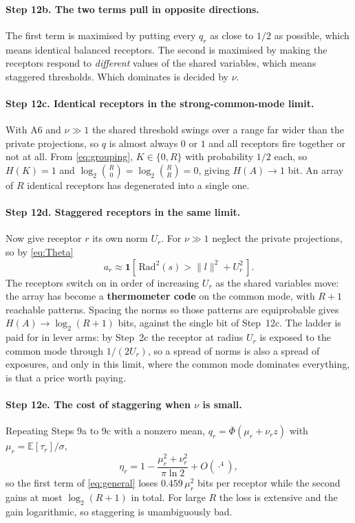 \documentclass[11pt,a4paper]{article}
\newcommand{\EE}{\mathbb{E}}
\newcommand{\Phibar}{\overline{\Phi}}
\begin{document}
\paragraph{Step 12b. The two terms pull in opposite directions.} The first term is
maximised by putting every $q_r$ as close to $1/2$ as possible, which means identical
balanced receptors. The second is maximised by making the receptors respond to
\emph{different} values of the shared variables, which means staggered thresholds.
Which dominates is decided by $\nu$.

\paragraph{Step 12c. Identical receptors in the strong-common-mode limit.} With A6 and
$\nu\gg1$ the shared threshold swings over a range far wider than the private
projections, so $q$ is almost always $0$ or $1$ and all receptors fire together or not
at all. From \eqref{eq:grouping}, $K\in\{0,R\}$ with probability $1/2$ each, so $H(K)=1$
and $\log_2\binom{R}{0}=\log_2\binom{R}{R}=0$, giving $H(A)\to1$ bit. An array of $R$
identical receptors has degenerated into a single one.

\paragraph{Step 12d. Staggered receptors in the same limit.} Now give receptor $r$ its
own norm $U_r$. For $\nu\gg1$ neglect the private projections, so by \eqref{eq:Theta}
\begin{equation}
  a_r \approx \mathbf{1}\!\left[\,\mathrm{Rad}^2(s) > \|l\|^2+U_r^2\,\right].
\end{equation}
The receptors switch on in order of increasing $U_r$ as the shared variables move: the
array has become a \textbf{thermometer code} on the common mode, with $R+1$ reachable
patterns. Spacing the norms so those patterns are equiprobable gives
$H(A)\to\log_2(R+1)$ bits, against the single bit of Step~12c. The ladder is paid for in
lever arms: by Step~2c the receptor at radius $U_r$ is exposed to the common mode through
$1/(2U_r)$, so a spread of norms is also a spread of exposures, and only in this limit,
where the common mode dominates everything, is that a price worth paying.

\paragraph{Step 12e. The cost of staggering when $\nu$ is small.} Repeating Steps 9a to
9c with a nonzero mean, $q_r=\Phibar(\mu_r+\nu_r z)$ with $\mu_r=\EE[\tau_r]/\sigma$,
\begin{equation}
  \eta_r=1-\frac{\mu_r^2+\nu_r^2}{\pi\ln2}+O(\cdot^4),
  \label{eq:etar}
\end{equation}
so the first term of \eqref{eq:general} loses $0.459\,\mu_r^2$ bits per receptor while
the second gains at most $\log_2(R+1)$ in total. For large $R$ the loss is extensive and
the gain logarithmic, so staggering is unambiguously bad.
\end{document}
